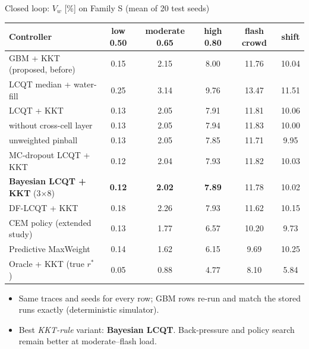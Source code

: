 \documentclass[aspectratio=169,11pt,xcolor=table]{beamer}
\newcommand{\rstar}{r^{\ast}}
\newcommand{\best}[1]{\textbf{\textcolor{good}{#1}}}
\begin{document}
\begin{frame}{Closed loop: $V_w$ [\%] on Family S (mean of 20 test seeds)}
  \scriptsize
  \centering
  \begin{tabular}{lccccc}
    \toprule
    Controller & low 0.50 & moderate 0.65 & high 0.80 & flash crowd & shift \\
    \midrule
    GBM + KKT (proposed, before) & 0.15 & 2.15 & 8.00 & 11.76 & 10.04 \\
    LCQT median + water-fill & 0.25 & 3.14 & 9.76 & 13.47 & 11.51 \\
    LCQT + KKT & 0.13 & 2.05 & 7.91 & 11.81 & 10.06 \\
    \quad without cross-cell layer & 0.13 & 2.05 & 7.94 & 11.83 & 10.00 \\
    \quad unweighted pinball & 0.13 & 2.05 & 7.85 & 11.71 & 9.95 \\
    MC-dropout LCQT + KKT & 0.12 & 2.04 & 7.93 & 11.82 & 10.03 \\
    \rowcolor{good!10} \textbf{Bayesian LCQT + KKT} (3$\times$8) & \best{0.12} & \best{2.02} & \best{7.89} & 11.78 & 10.02 \\
    DF-LCQT + KKT & 0.18 & 2.26 & 7.93 & 11.62 & 10.15 \\
    \midrule
    CEM policy (extended study) & 0.13 & 1.77 & 6.57 & 10.20 & 9.73 \\
    Predictive MaxWeight & 0.14 & 1.62 & 6.15 & 9.69 & 10.25 \\
    Oracle + KKT (true $\rstar$) & 0.05 & 0.88 & 4.77 & 8.10 & 5.84 \\
    \bottomrule
  \end{tabular}
  \normalsize
  \vspace{2pt}
  \begin{itemize}\footnotesize
    \item Same traces and seeds for every row; GBM rows re-run and match the stored runs exactly (deterministic simulator).
    \item Best \emph{KKT-rule} variant: \textbf{Bayesian LCQT}. Back-pressure and policy search remain better at moderate--flash load.
  \end{itemize}
\end{frame}
\end{document}

